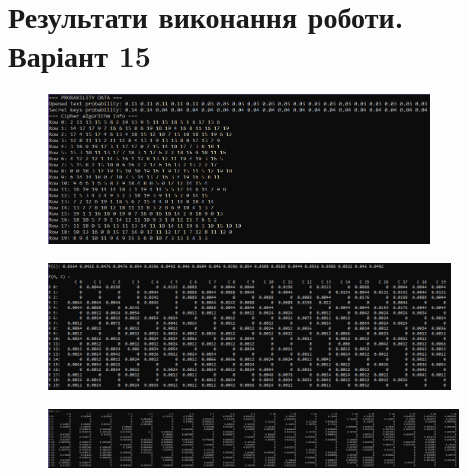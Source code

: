 \section{Результати виконання роботи. Варіант 15}
\begin{figure}[!ht]
    \centering
    \begin{minipage}{0.95\linewidth}
        \includegraphics[width=0.9\textwidth, scale = 2.0]{ReportPic/report_1.png}
    \end{minipage}
\end{figure}
\newpage
\begin{figure}[!ht]
        \centering
        \begin{minipage}{0.95\linewidth}
            \includegraphics[width=0.95\textwidth, scale=1.2]{ReportPic/report_2.png} %
        \end{minipage}
\end{figure}
\begin{figure}[!ht]
        \centering
        \begin{minipage}{0.97\linewidth}
            \includegraphics[width=0.97\textwidth, scale=1.5]{ReportPic/report_3.png}
        \end{minipage}
\end{figure}

